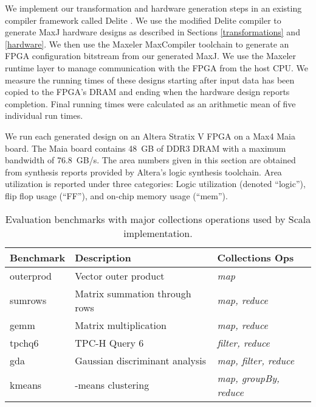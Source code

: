\documentclass[pageno]{jpaper}
\begin{document}
We implement our transformation and hardware generation steps in an existing compiler framework called Delite \cite{delite-tecs14}.
We use the modified Delite compiler to generate MaxJ hardware designs as described in Sections \ref{transformations} and \ref{hardware}.
We then use the Maxeler MaxCompiler toolchain to generate an FPGA configuration bitstream from our generated MaxJ. We use the Maxeler runtime layer to manage communication with the FPGA from the host CPU.
We measure the running times of these designs starting after input data has been copied to the FPGA's DRAM and ending when the hardware design reports completion.
Final running times were calculated as an arithmetic mean of five individual run times.

We run each generated design on an Altera Stratix V FPGA on a Max4 Maia board.
The Maia board contains 48~GB of DDR3 DRAM with a maximum bandwidth of 76.8~GB/s.
The area numbers given in this section are obtained from synthesis reports provided by Altera's logic synthesis toolchain.
Area utilization is reported under three categories: Logic utilization (denoted ``logic''), flip flop usage (``FF''), and on-chip memory usage (``mem'').




\begin{table}
\centering\footnotesize
\begin{tabular}{lll}
\toprule

{\bf Benchmark} & {\bf Description} & {\bf Collections Ops} \\ \midrule
outerprod & Vector outer product & \emph{map} \\ \midrule
sumrows & Matrix summation through rows & \emph{map, reduce} \\ \midrule
gemm & Matrix multiplication & \emph{map, reduce} \\ \midrule
tpchq6 & TPC-H Query 6 & \emph{filter, reduce} \\ \midrule
gda & Gaussian discriminant analysis & \emph{map, filter, reduce} \\ \midrule
kmeans & -means clustering & \emph{map, groupBy, reduce} \\ \bottomrule
\end{tabular}
\caption{Evaluation benchmarks with major collections operations used by
Scala implementation.}
\label{table:benchmarks}
\end{table}
\end{document}
